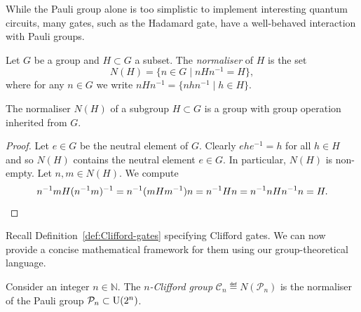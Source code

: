 \documentclass[a4paper, oneside, 12pt]{amsart}
\newcommand*{\PauliGroup}{\ensuremath{\mathcal{P}}}
\begin{document}
While the Pauli group alone is too simplistic to implement interesting quantum circuits, many gates, such as the Hadamard gate, have a well-behaved interaction with Pauli groups.

\begin{definition}\label{def:normaliser-of-group}
  Let \(G\) be a group and \(H \subset G\) a subset.
  The \emph{normaliser} of \(H\) is the set
  \begin{equation}
    N(H) =\{n \in G \mid nHn^{-1} = H\},
  \end{equation}
  where for any \(n\in G\) we write \(nHn^{-1} =\{nhn^{-1} \mid h\in H\}\).
\end{definition}


\begin{lemma}\label{lem:normaliser-of-group-is-group}
  The normaliser \(N(H)\) of a subgroup \(H \subset G\) is a group with group operation inherited from \(G\).
\end{lemma}
\begin{proof}
  Let \(e\in G\) be the neutral element of \(G\).
  Clearly \(ehe^{-1} = h \) for all \(h\in H\) and so \(N(H)\) contains the neutral element \(e\in G\).
  In particular, \(N(H)\) is non-empty.
  Let \(n,m\in N(H)\).
  We compute
  \begin{equation*}
    n^{-1}m H (n^{-1}m)^{-1}
    = n^{-1}(mHm^{-1})n
    = n^{-1}Hn
    = n^{-1}nHn^{-1}n
    = H. \qedhere
  \end{equation*}
\end{proof}

Recall  Definition~\ref{def:Clifford-gates} specifying Clifford gates.
We can now provide a concise mathematical framework for them using our group-theoretical language.

\begin{definition}\label{def:Clifford-group}
  Consider an integer \(n\in \mathbb{N}\).
  The \emph{\(n\)-Clifford group} \(\mathcal{C}_{n}\eqdef N(\PauliGroup_{n})\) is the normaliser of the Pauli group \(\PauliGroup_{n}\subset\U(2^{n})\).
\end{definition}
\end{document}
